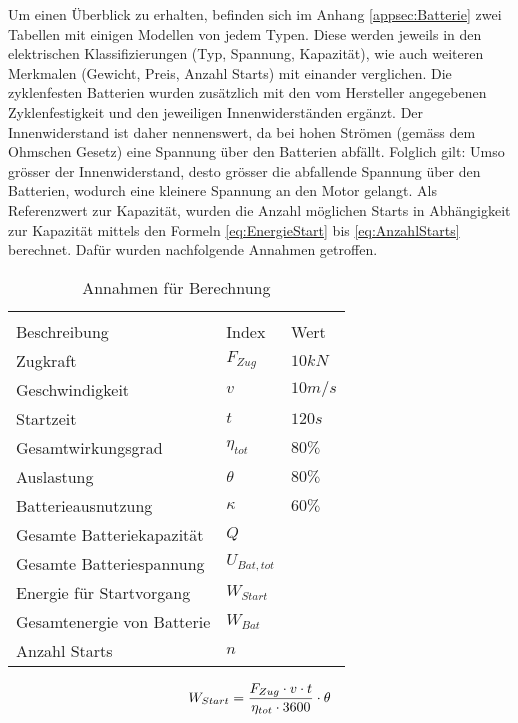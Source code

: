 Um einen Überblick zu erhalten, befinden sich im Anhang \ref{appsec:Batterie} zwei Tabellen mit einigen Modellen von jedem Typen. Diese werden jeweils in den elektrischen Klassifizierungen (Typ, Spannung, Kapazität), wie auch weiteren Merkmalen (Gewicht, Preis, Anzahl Starts) mit einander verglichen. Die zyklenfesten Batterien wurden zusätzlich mit den vom Hersteller angegebenen Zyklenfestigkeit und den jeweiligen Innenwiderständen ergänzt. Der Innenwiderstand ist daher nennenswert, da bei hohen Strömen (gemäss dem Ohmschen Gesetz) eine Spannung über den Batterien abfällt. Folglich gilt: Umso grösser der Innenwiderstand, desto grösser die abfallende Spannung über den Batterien, wodurch eine kleinere Spannung an den Motor gelangt.
Als Referenzwert zur Kapazität, wurden die Anzahl möglichen Starts in Abhängigkeit zur Kapazität mittels den Formeln \ref{eq:EnergieStart} bis \ref{eq:AnzahlStarts} berechnet. Dafür wurden nachfolgende Annahmen getroffen. 

\begin{table}[H]
	\centering
	\begin{tabular}{C{5cm} C{2.5cm} C{2cm}}
		\\
	{Beschreibung} & {Index} & {Wert} \\ \hline
	Zugkraft    &   $ F_{Zug} $    & $10 kN$   \\
	Geschwindigkeit    &   $ v $    & $10 m/s$   \\
	Startzeit    &   $ t $   & $120 s$   \\
	Gesamtwirkungsgrad    &  $ \eta_{tot} $    & $80\%$   \\
	Auslastung    &  $ \theta $   & $80\%$  \\
	Batterieausnutzung    &  $ \kappa $    & $60\%$   \\
	Gesamte Batteriekapazität   &   $ Q $    &   \\
	Gesamte Batteriespannung    &   $ U_{Bat,tot} $    &   \\
	Energie für Startvorgang    &   $ W_{Start} $    &   \\
	Gesamtenergie von Batterie   &   $ W_{Bat} $    &   \\
	Anzahl Starts    &   $ n $    &    \\	
	\end{tabular}
	\caption{Annahmen für Berechnung}
	\label{tab:BerechnungAnzahlStart}
\end{table}

\begin{equation}
\centering
	W_{Start}=\frac{F_{Zug}\cdot v \cdot t}{\eta_{tot}\cdot 3600}\cdot \theta
\label{eq:EnergieStart}
\end{equation}

